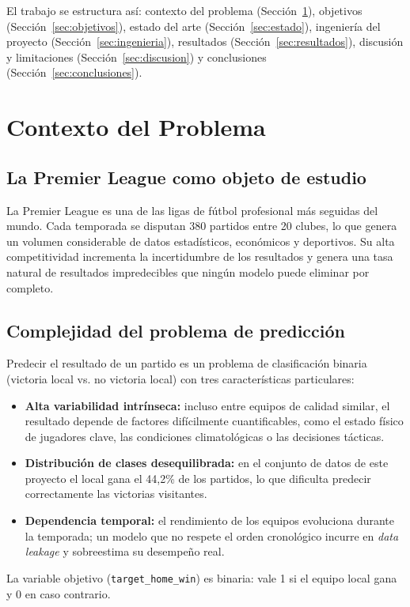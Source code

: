 \documentclass{ieeeaccess}
\begin{document}
El trabajo se estructura así: contexto del problema (Sección~\ref{sec:contexto}), objetivos (Sección~\ref{sec:objetivos}), estado del arte (Sección~\ref{sec:estado}), ingeniería del proyecto (Sección~\ref{sec:ingenieria}), resultados (Sección~\ref{sec:resultados}), discusión y limitaciones (Sección~\ref{sec:discusion}) y conclusiones (Sección~\ref{sec:conclusiones}).

\section{Contexto del Problema}
\label{sec:contexto}

\subsection{La Premier League como objeto de estudio}
La Premier League es una de las ligas de fútbol profesional más seguidas del mundo. Cada temporada se disputan 380 partidos entre 20 clubes, lo que genera un volumen considerable de datos estadísticos, económicos y deportivos. Su alta competitividad incrementa la incertidumbre de los resultados y genera una tasa natural de resultados impredecibles que ningún modelo puede eliminar por completo.

\subsection{Complejidad del problema de predicción}
Predecir el resultado de un partido es un problema de clasificación binaria (victoria local vs. no victoria local) con tres características particulares:
\begin{itemize}
\item \textbf{Alta variabilidad intrínseca:} incluso entre equipos de calidad similar, el resultado depende de factores difícilmente cuantificables, como el estado físico de jugadores clave, las condiciones climatológicas o las decisiones tácticas.
\item \textbf{Distribución de clases desequilibrada:} en el conjunto de datos de este proyecto el local gana el 44,2\% de los partidos, lo que dificulta predecir correctamente las victorias visitantes.
\item \textbf{Dependencia temporal:} el rendimiento de los equipos evoluciona durante la temporada; un modelo que no respete el orden cronológico incurre en \textit{data leakage} y sobreestima su desempeño real.
\end{itemize}
La variable objetivo (\texttt{target\_home\_win}) es binaria: vale 1 si el equipo local gana y 0 en caso contrario.
\end{document}
